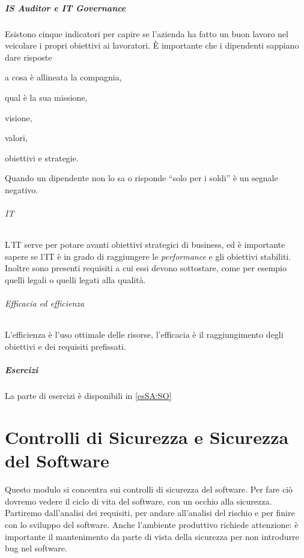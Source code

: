 \subsubsection{IS Auditor e IT Governance}

Esistono cinque indicatori per capire se l'azienda ha fatto un buon lavoro nel
veicolare i propri obiettivi ai lavoratori. È importante che i dipendenti
sappiano dare risposte
\begin{enumerate*}[label=\arabic*)]
\item a cosa è allineata la compagnia,
\item qual è la sua missione,
\item visione,
\item valori,
\item obiettivi e strategie.
\end{enumerate*}

Quando un dipendente non lo sa o
risponde ``solo per i soldi'' è un segnale negativo.

\paragraph*{IT} L'IT serve per potare avanti obiettivi strategici di business,
ed è importante sapere se l'IT è in grado di raggiungere le \textit{performance}
e gli obiettivi stabiliti. Inoltre sono presenti requisiti a cui essi devono
sottostare, come per esempio quelli legali o quelli legati alla qualità.

\paragraph*{Efficacia ed efficienza} L'efficienza è l'uso ottimale delle
risorse, l'efficacia è il raggiungimento degli obiettivi e dei requisiti
prefissati.


\subsubsection{Esercizi}

La parte di esercizi è disponibili in \ref{esSA:SO}

\part{Controlli di Sicurezza e Sicurezza del Software}
\label{part:csss}
Questo modulo si concentra sui controlli di sicurezza del software. Per fare ciò
dovremo vedere il ciclo di vita del software, con un occhio alla sicurezza.
Partiremo dall'analisi dei requisiti, per andare all'analisi del rischio e per
finire con lo sviluppo del software.
Anche l'ambiente produttivo richiede attenzione: è importante il mantenimento da
parte di vista della sicurezza per non introdurre bug nel software.


